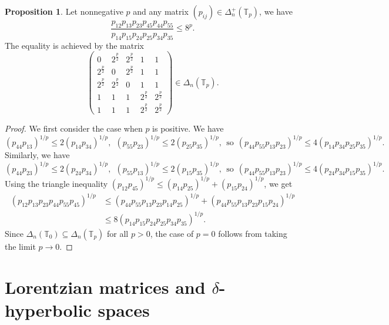 \documentclass{amsart}
\theoremstyle{definition}
\newtheorem{proposition}[theorem]{Proposition}
\theoremstyle{remark}
\def\T{\mathbb{T}}
\begin{document}
\begin{proposition}
Let nonnegative $p$ and any matrix $(p_{ij}) \in \Delta_n^+(\T_p)$, we have
\[
\frac{p_{12}p_{13}p_{23}p_{45}p_{44}p_{55}}{p_{14}p_{15}p_{24}p_{25}p_{34}p_{35}} \le 8^{p}.
\]
The equality is achieved by the matrix 
\[
\begin{pmatrix}
0 & 2^{\frac{p}{2}} & 2^{\frac{p}{2}} & 1 & 1 \\
2^{\frac{p}{2}} & 0 & 2^{\frac{p}{2}} & 1 & 1 \\
2^{\frac{p}{2}} & 2^{\frac{p}{2}} & 0 & 1 & 1 \\
1 & 1 & 1 & 2^{\frac{p}{2}} & 2^{\frac{p}{2}} \\
1 & 1 & 1 & 2^{\frac{p}{2}} & 2^{\frac{p}{2}}
\end{pmatrix} \in \Delta_n(\T_p).
\]
\end{proposition}
\begin{proof}
We first consider the case when $p$ is positive. We have
\[
(p_{44}p_{13})^{1/p} \le 2 (p_{14}p_{34})^{1/p}, ~~ (p_{55}p_{23})^{1/p} \le 2 (p_{25}p_{35})^{1/p}, \ \ \text{so} \ \ (p_{44}p_{55}p_{13}p_{23})^{1/p} \le 4 (p_{14}p_{34}p_{25}p_{35})^{1/p}.
\]
Similarly, we have
\[
(p_{44}p_{23})^{1/p} \le 2 (p_{24}p_{34})^{1/p}, ~~ (p_{55}p_{13})^{1/p} \le 2 (p_{15}p_{35})^{1/p}, \ \ \text{so} \ \ (p_{44}p_{55}p_{13}p_{23})^{1/p} \le 4 (p_{24}p_{34}p_{15}p_{35})^{1/p}.
\]
Using the triangle inequality $(p_{12}p_{45})^{1/p} \le (p_{14}p_{25})^{1/p}+(p_{15}p_{24})^{1/p}$, we get
\begin{align*}
(p_{12}p_{13}p_{23}p_{44}p_{55}p_{45})^{1/p} &\le (p_{44}p_{55}p_{13}p_{23}p_{14}p_{25})^{1/p}+(p_{44}p_{55}p_{13}p_{23}p_{15}p_{24})^{1/p} \\
&\le 8(p_{14}p_{15}p_{24}p_{25}p_{34}p_{35})^{1/p}.
\end{align*}
Since $\Delta_n(\T_0) \subseteq \Delta_n(\T_p)$ for all $p>0$, the case of $p=0$ follows from taking the limit $p \to 0$.
\end{proof}


\section{Lorentzian matrices and $\delta$-hyperbolic spaces}\label{sec:hyperbolic}


\end{document}
